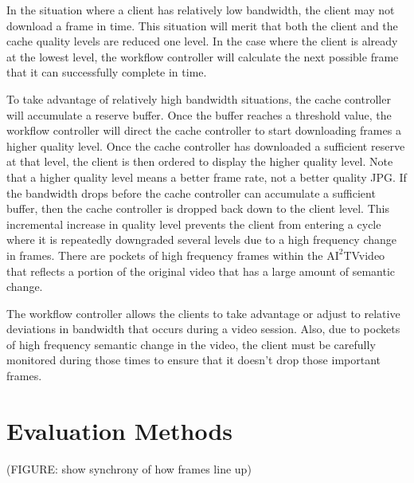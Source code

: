 \documentclass[10pt]{article}
\newcommand{\aiitv}[0]{$\mathrm{AI}^2$TV}
\begin{document}
In the situation where a client has relatively low bandwidth, the
client may not download a frame in time.  This situation will merit
that both the client and the cache quality levels are reduced one
level.  In the case where the client is already at the lowest level,
the workflow controller will calculate the next possible frame that it
can successfully complete in time.

To take advantage of relatively high bandwidth situations, the cache
controller will accumulate a reserve buffer.  Once the buffer reaches
a threshold value, the workflow controller will direct the cache
controller to start downloading frames a higher quality level.  Once
the cache controller has downloaded a sufficient reserve at that
level, the client is then ordered to display the higher quality level.
Note that a higher quality level means a better frame rate, not a
better quality JPG.  If the bandwidth drops before the cache
controller can accumulate a sufficient buffer, then the cache
controller is dropped back down to the client level.  This incremental
increase in quality level prevents the client from entering a cycle
where it is repeatedly downgraded several levels due to a high
frequency change in frames.  There are pockets of high frequency
frames within the \aiitv video that reflects a portion of the original
video that has a large amount of semantic change.

The workflow controller allows the clients to take advantage or adjust
to relative deviations in bandwidth that occurs during a video
session.  Also, due to pockets of high frequency semantic change in
the video, the client must be carefully monitored during those times
to ensure that it doesn't drop those important frames.

\section{Evaluation Methods} \label{eval}

(FIGURE: show synchrony of how frames line up)
\end{document}
